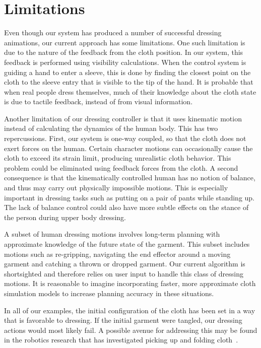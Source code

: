 \section{Limitations}

Even though our system has produced a number of successful dressing
animations, our current approach has some limitations.  One such
limitation is due to the nature of the feedback from the cloth position.
In our system, this feedback is performed using visibility calculations.
When the control system is guiding a hand to enter a sleeve, this is done
by finding the closest point on the cloth to the sleeve entry that is
visible to the tip of the hand.  It is probable that when real people
dress themselves, much of their knowledge about the cloth state is due
to tactile feedback, instead of from visual information.

Another limitation of our dressing controller is that it uses kinematic
motion instead of calculating the dynamics of the human body.  This has
two repercussions.  First, our system is one-way coupled, so that the
cloth does not exert forces on the human.  Certain character motions can
occasionally cause the cloth to exceed its strain limit, producing
unrealistic cloth behavior.  This problem could be eliminated using
feedback forces from the cloth.  A second consequence is that the
kinematically controlled human has no notion of balance, and thus may
carry out physically impossible motions.  This is especially important in
dressing tasks such as putting on a pair of pants while standing up.  The
lack of balance control could also have more subtle effects on the stance
of the person during upper body dressing.

A subset of human dressing motions involves long-term planning with approximate knowledge of the future state of the garment. This subset includes motions such as re-gripping, navigating the end effector around a moving garment and catching a thrown or dropped garment. Our current algorithm is shortsighted and therefore relies on user input to handle this class of dressing motions. It is reasonable to imagine incorporating faster, more approximate cloth simulation models to increase planning accuracy in these situations.

In all of our examples, the initial configuration of the cloth has been
set in a way that is favorable to dressing.  If the initial garment were
tangled, our dressing actions would most likely fail.  A possible avenue
for addressing this may be found in the robotics research that has
investigated picking up and folding cloth~\cite{Cusumano:2011:BCD}.

